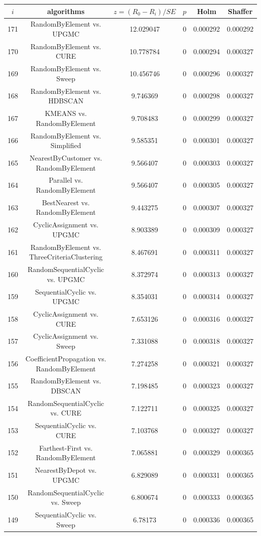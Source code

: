 \documentclass[a4paper,10pt]{article}
\begin{document}
\begin{landscape}
\begin{table}[!htp]
\centering\scriptsize
\begin{tabular}{cccccc}
$i$&algorithms&$z=(R_0 - R_i)/SE$&$p$&Holm&Shaffer\\
\hline171&RandomByElement vs. UPGMC&12.029047&0&0.000292&0.000292\\
170&RandomByElement vs. CURE&10.778784&0&0.000294&0.000327\\
169&RandomByElement vs. Sweep&10.456746&0&0.000296&0.000327\\
168&RandomByElement vs. HDBSCAN&9.746369&0&0.000298&0.000327\\
167&KMEANS vs. RandomByElement&9.708483&0&0.000299&0.000327\\
166&RandomByElement vs. Simplified&9.585351&0&0.000301&0.000327\\
165&NearestByCustomer vs. RandomByElement&9.566407&0&0.000303&0.000327\\
164&Parallel vs. RandomByElement&9.566407&0&0.000305&0.000327\\
163&BestNearest vs. RandomByElement&9.443275&0&0.000307&0.000327\\
162&CyclicAssignment vs. UPGMC&8.903389&0&0.000309&0.000327\\
161&RandomByElement vs. ThreeCriteriaClustering&8.467691&0&0.000311&0.000327\\
160&RandomSequentialCyclic vs. UPGMC&8.372974&0&0.000313&0.000327\\
159&SequentialCyclic vs. UPGMC&8.354031&0&0.000314&0.000327\\
158&CyclicAssignment vs. CURE&7.653126&0&0.000316&0.000327\\
157&CyclicAssignment vs. Sweep&7.331088&0&0.000318&0.000327\\
156&CoefficientPropagation vs. RandomByElement&7.274258&0&0.000321&0.000327\\
155&RandomByElement vs. DBSCAN&7.198485&0&0.000323&0.000327\\
154&RandomSequentialCyclic vs. CURE&7.122711&0&0.000325&0.000327\\
153&SequentialCyclic vs. CURE&7.103768&0&0.000327&0.000327\\
152&Farthest-First vs. RandomByElement&7.065881&0&0.000329&0.000365\\
151&NearestByDepot vs. UPGMC&6.829089&0&0.000331&0.000365\\
150&RandomSequentialCyclic vs. Sweep&6.800674&0&0.000333&0.000365\\
149&SequentialCyclic vs. Sweep&6.78173&0&0.000336&0.000365\\

\end{tabular}
\end{table}
\end{landscape}
\end{document}
